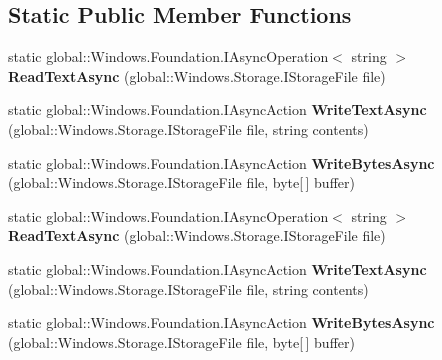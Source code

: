 \subsection*{Static Public Member Functions}
\begin{DoxyCompactItemize}
\item 
\mbox{\label{class_windows_1_1_storage_1_1_file_i_o_a411237b5a14427f6e2c78e10509be853}} 
static global\+::\+Windows.\+Foundation.\+I\+Async\+Operation$<$ string $>$ {\bfseries Read\+Text\+Async} (global\+::\+Windows.\+Storage.\+I\+Storage\+File file)
\item 
\mbox{\label{class_windows_1_1_storage_1_1_file_i_o_aaa50a5498a60e66bd4e0777c65f59200}} 
static global\+::\+Windows.\+Foundation.\+I\+Async\+Action {\bfseries Write\+Text\+Async} (global\+::\+Windows.\+Storage.\+I\+Storage\+File file, string contents)
\item 
\mbox{\label{class_windows_1_1_storage_1_1_file_i_o_a68b7b3281a0169ff7895ebb2d7ee14b2}} 
static global\+::\+Windows.\+Foundation.\+I\+Async\+Action {\bfseries Write\+Bytes\+Async} (global\+::\+Windows.\+Storage.\+I\+Storage\+File file, byte\mbox{[}$\,$\mbox{]} buffer)
\item 
\mbox{\label{class_windows_1_1_storage_1_1_file_i_o_a411237b5a14427f6e2c78e10509be853}} 
static global\+::\+Windows.\+Foundation.\+I\+Async\+Operation$<$ string $>$ {\bfseries Read\+Text\+Async} (global\+::\+Windows.\+Storage.\+I\+Storage\+File file)
\item 
\mbox{\label{class_windows_1_1_storage_1_1_file_i_o_aaa50a5498a60e66bd4e0777c65f59200}} 
static global\+::\+Windows.\+Foundation.\+I\+Async\+Action {\bfseries Write\+Text\+Async} (global\+::\+Windows.\+Storage.\+I\+Storage\+File file, string contents)
\item 
\mbox{\label{class_windows_1_1_storage_1_1_file_i_o_a68b7b3281a0169ff7895ebb2d7ee14b2}} 
static global\+::\+Windows.\+Foundation.\+I\+Async\+Action {\bfseries Write\+Bytes\+Async} (global\+::\+Windows.\+Storage.\+I\+Storage\+File file, byte\mbox{[}$\,$\mbox{]} buffer)

\end{DoxyCompactItemize}
